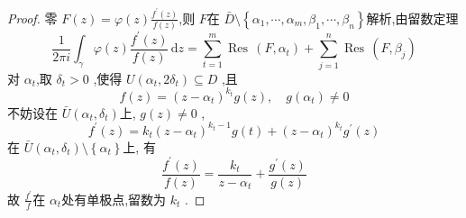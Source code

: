 \documentclass[../../复变函数.tex]{subfiles}
\begin{document}
\begin{proof}
    零 \(  F  \left( z \right)=  \varphi \left( z \right) \frac{f^{\prime} \left( z \right)  }{f\left( z \right)  }   \),则 \(  F  \)在 \(  \bar{D}\setminus \left\{  \alpha_1,\cdots,\alpha_m , \beta_1,\cdots,\beta_n  \right\}  \)解析,由留数定理 \[
    \frac{1 }{2\pi i } \int_{ \gamma } \varphi \left( z \right)\frac{f^{\prime} \left( z \right)  }{f\left( z \right)  }\,\mathrm{d} z= \sum _{t= 1}^{m}\operatorname{Res}\,\left( F,\alpha _{t} \right)+ \sum _{j= 1}^{n} \operatorname{Res}\,\left( F,\beta _{j} \right)     
    \]对 \(  \alpha _{t}  \),取 \(   \delta  _{t}> 0  \)     ,使得 \(  U\left( \alpha _{t},2 \delta  _{t} \right)\subseteq D   \) ,且 \[
    f\left( z \right)= \left( z-\alpha _{t} \right)^{k_{t}} g\left( z \right),\quad g\left( \alpha _{t} \right)\neq 0    
    \]不妨设在 \(  \bar{U}\left( \alpha _{t}, \delta  _{t} \right)   \)上, \(  g\left( z \right)\neq 0   \)  , \[
    f^{\prime} \left( z \right)= k_{t}\left( z-\alpha _{t} \right)^{k_{t}-1}g\left( t \right)   + \left( z-\alpha _{t} \right)^{k_{t}} g^{\prime} \left( z \right) 
    \]在 \(  \bar{U}\left( \alpha _{t} , \delta  _{t}\right)\setminus \left\{ \alpha _{t} \right\}   \)上, 有 \[
    \frac{f^{\prime} \left( z \right)  }{f\left( z \right)  }=  \frac{k_{t} }{z-\alpha _{t} }+ \frac{g^{\prime} \left( z \right)  }{g\left( z \right)  }   
    \] 故 \(  \frac{f^{\prime}  }{ f}   \)在 \(  \alpha _{t}  \)处有单极点,留数为 \(  k_{t}  \)   .


\end{proof}
\end{document}
